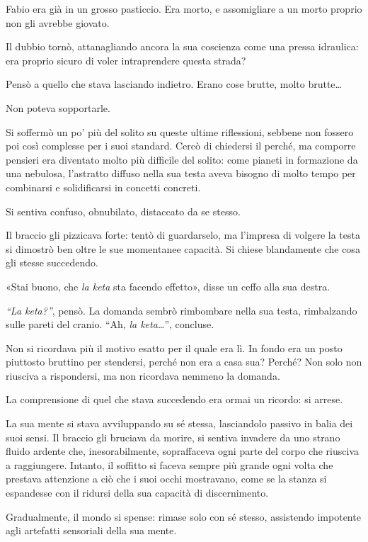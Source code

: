 Fabio era già in un grosso pasticcio. Era morto, e assomigliare a un morto proprio non gli avrebbe giovato.

Il dubbio tornò, attanagliando ancora la sua coscienza come una pressa idraulica: era proprio sicuro di voler intraprendere questa strada?

Pensò a quello che stava lasciando indietro. Erano cose brutte, molto brutte\ldots{}

Non poteva sopportarle.

Si soffermò un po' più del solito su queste ultime riflessioni, sebbene non fossero poi così complesse per i suoi standard. Cercò di chiedersi il perché, ma comporre pensieri era diventato molto più difficile del solito: come pianeti in formazione da una nebulosa, l'astratto diffuso nella sua testa aveva bisogno di molto tempo per combinarsi e solidificarsi in concetti concreti.

Si sentiva confuso, obnubilato, distaccato da se stesso.

Il braccio gli pizzicava forte: tentò di guardarselo, ma l'impresa di volgere la testa si dimostrò ben oltre le sue momentanee capacità. Si chiese blandamente che cosa gli stesse succedendo.

«Stai buono, che \emph{la keta} sta facendo effetto», disse un ceffo alla sua destra.

\emph{``La keta?''}, pensò. La domanda sembrò rimbombare nella sua testa, rimbalzando sulle pareti del cranio. ``Ah, \emph{la keta\ldots{}}'', concluse.

Non si ricordava più il motivo esatto per il quale era lì. In fondo era un posto piuttosto bruttino per stendersi, perché non era a casa sua? Perché? Non solo non riusciva a rispondersi, ma non ricordava nemmeno la domanda.

La comprensione di quel che stava succedendo era ormai un ricordo: si arrese.

La sua mente si stava avviluppando su sé stessa, lasciandolo passivo in balia dei suoi sensi. Il braccio gli bruciava da morire, si sentiva invadere da uno strano fluido ardente che, inesorabilmente, sopraffaceva ogni parte del corpo che riusciva a raggiungere. Intanto, il soffitto si faceva sempre più grande ogni volta che prestava attenzione a ciò che i suoi occhi mostravano, come se la stanza si espandesse con il ridursi della sua capacità di discernimento.

Gradualmente, il mondo si spense: rimase solo con sé stesso, assistendo impotente agli artefatti sensoriali della sua mente.